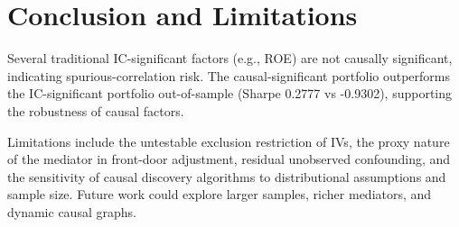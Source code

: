 \documentclass[12pt,a4paper]{article}
\begin{document}
\section{Conclusion and Limitations}
Several traditional IC-significant factors (e.g., ROE) are not causally significant, indicating spurious-correlation risk. The causal-significant portfolio outperforms the IC-significant portfolio out-of-sample (Sharpe 0.2777 vs -0.9302), supporting the robustness of causal factors.

Limitations include the untestable exclusion restriction of IVs, the proxy nature of the mediator in front-door adjustment, residual unobserved confounding, and the sensitivity of causal discovery algorithms to distributional assumptions and sample size. Future work could explore larger samples, richer mediators, and dynamic causal graphs.



\end{document}
